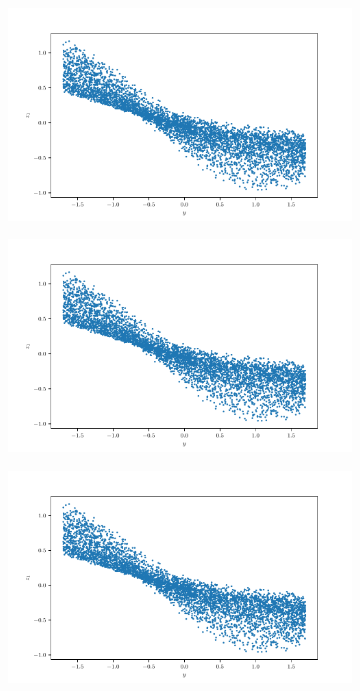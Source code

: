 \documentclass[10pt,a4paper]{article}
\begin{document}
\begin{figure}[!ht]
\begin{subfigure}{0.3\textwidth}
        \caption{}
        \label{cfig_xz2}
    \end{subfigure}
    \begin{subfigure}{0.3\textwidth}
        \centering	
        \includegraphics[width=\textwidth]{cube_trans_y_z1.pdf}
        \caption{}
        \label{cfig_yz0}
    \end{subfigure}
    \begin{subfigure}{0.3\textwidth}
        \centering
        \includegraphics[width=\textwidth] {cube_trans_y_z1.pdf}
        \caption{}
        \label{cfig_yz1}
    \end{subfigure}
    \begin{subfigure}{0.3\textwidth}
        \centering	
        \includegraphics[width=\textwidth]{cube_trans_y_z1.pdf}

\end{subfigure}
\end{figure}
\end{document}
